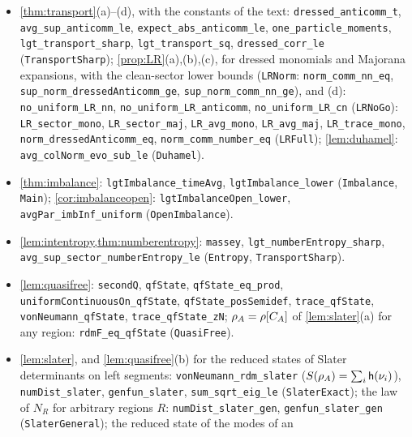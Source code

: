 \begin{itemize}[leftmargin=1.5em,itemsep=1pt]
\texttt{transfer\_zariski\_dense} (\texttt{Zariski}), by an elementary argument: the zero set in $SL(2,\R)$ of the
polynomials vanishing on the group is closed under products and contains all unipotent matrices.
\item \cref{thm:transport}(a)--(d), with the constants of the text: \texttt{dressed\_anticomm\_t},
\texttt{avg\_sup\_anticomm\_le}, \texttt{expect\_abs\_anticomm\_le}, \texttt{one\_particle\_moments},
\texttt{lgt\_transport\_sharp}, \texttt{lgt\_transport\_sq}, \texttt{dressed\_corr\_le} (\texttt{TransportSharp});
\cref{prop:LR}(a),(b),(c), for dressed monomials and Majorana expansions, with the clean-sector lower bounds
(\texttt{LRNorm}: \texttt{norm\_comm\_nn\_eq}, \texttt{sup\_norm\_dressedAnticomm\_ge}, \texttt{sup\_norm\_comm\_nn\_ge}),
and (d): \texttt{no\_uniform\_LR\_nn}, \texttt{no\_uniform\_LR\_anticomm}, \texttt{no\_uniform\_LR\_cn} (\texttt{LRNoGo}):
\texttt{LR\_sector\_mono}, \texttt{LR\_sector\_maj}, \texttt{LR\_avg\_mono}, \texttt{LR\_avg\_maj},
\texttt{LR\_trace\_mono}, \texttt{norm\_dressedAnticomm\_eq}, \texttt{norm\_comm\_number\_eq} (\texttt{LRFull});
\cref{lem:duhamel}: \texttt{avg\_colNorm\_evo\_sub\_le} (\texttt{Duhamel}).
\item \cref{thm:imbalance}: \texttt{lgtImbalance\_timeAvg}, \texttt{lgtImbalance\_lower}
(\texttt{Imbalance}, \texttt{Main}); \cref{cor:imbalanceopen}: \texttt{lgtImbalanceOpen\_lower},
\texttt{avgPar\_imbInf\_uniform} (\texttt{OpenImbalance}).
\item \cref{lem:intentropy,thm:numberentropy}: \texttt{massey}, \texttt{lgt\_numberEntropy\_sharp},
\texttt{avg\_sup\_sector\_numberEntropy\_le} (\texttt{Entropy}, \texttt{TransportSharp}).
\item \cref{lem:quasifree}: \texttt{secondQ}, \texttt{qfState}, \texttt{qfState\_eq\_prod},
\texttt{uniformContinuousOn\_qfState}, \texttt{qfState\_posSemidef}, \texttt{trace\_qfState}, \texttt{vonNeumann\_qfState},
\texttt{trace\_qfState\_zN}; $\rho_A=\rho[C_A]$ of \cref{lem:slater}(a) for any region: \texttt{rdmF\_eq\_qfState}
(\texttt{QuasiFree}).
\item \cref{lem:slater}, and \cref{lem:quasifree}(b) for the reduced states of Slater determinants on left
segments: \texttt{vonNeumann\_rdm\_slater} ($S(\rho_A)=\sum_i\mathsf{h}(\nu_i)$), \texttt{numDist\_slater},
\texttt{genfun\_slater}, \texttt{sum\_sqrt\_eig\_le} (\texttt{SlaterExact}); the law of $N_R$ for arbitrary regions $R$:
\texttt{numDist\_slater\_gen}, \texttt{genfun\_slater\_gen} (\texttt{SlaterGeneral}); the reduced state of the modes of an

\end{itemize}

